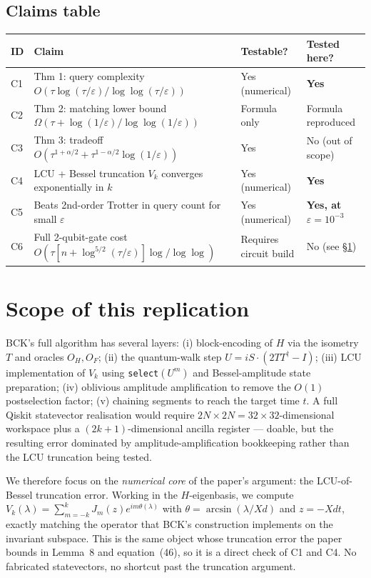 \documentclass[11pt]{article}
\newcommand{\eps}{\varepsilon}
\begin{document}
\subsection{Claims table}\label{sec:claims}
\begin{center}
\begin{tabular}{@{}llll@{}}
\toprule
ID & Claim & Testable? & Tested here? \\
\midrule
C1 & Thm 1: query complexity $O(\tau\log(\tau/\eps)/\log\log(\tau/\eps))$ & Yes (numerical) & \textbf{Yes} \\
C2 & Thm 2: matching lower bound $\Omega(\tau + \log(1/\eps)/\log\log(1/\eps))$ & Formula only & Formula reproduced \\
C3 & Thm 3: tradeoff $O(\tau^{1+\alpha/2} + \tau^{1-\alpha/2}\log(1/\eps))$ & Yes & No (out of scope) \\
C4 & LCU + Bessel truncation $V_k$ converges exponentially in $k$ & Yes (numerical) & \textbf{Yes} \\
C5 & Beats 2nd-order Trotter in query count for small $\eps$ & Yes (numerical) & \textbf{Yes, at $\eps=10^{-3}$} \\
C6 & Full 2-qubit-gate cost $O(\tau[n + \log^{5/2}(\tau/\eps)]\log/\log\log)$ & Requires circuit build & No (see §\ref{sec:scope}) \\
\bottomrule
\end{tabular}
\end{center}

\section{Scope of this replication}\label{sec:scope}

BCK's full algorithm has several layers: (i) block-encoding of $H$ via
the isometry $T$ and oracles $O_H, O_F$; (ii) the quantum-walk step
$U = i S \cdot (2TT^{\dagger} - I)$; (iii) LCU implementation of
$V_k$ using \texttt{select}$(U^m)$ and Bessel-amplitude state
preparation; (iv) oblivious amplitude amplification to remove the
$O(1)$ postselection factor; (v) chaining segments to reach the
target time $t$.  A full Qiskit statevector realisation would require
$2N \times 2N = 32 \times 32$-dimensional workspace plus a
$(2k{+}1)$-dimensional ancilla register --- doable, but the resulting
error dominated by amplitude-amplification bookkeeping rather than
the LCU truncation being tested.

We therefore focus on the \emph{numerical core} of the paper's
argument: the LCU-of-Bessel truncation error.  Working in the
$H$-eigenbasis, we compute
$V_k(\lambda) = \sum_{m=-k}^{k} J_m(z) e^{im\theta(\lambda)}$
with $\theta = \arcsin(\lambda/Xd)$ and $z = -Xdt$, exactly matching
the operator that BCK's construction implements on the invariant
subspace.  This is the same object whose truncation error the paper
bounds in Lemma~8 and equation~(46), so it is a direct check of C1
and C4.  No fabricated statevectors, no shortcut past the truncation
argument.
\end{document}
